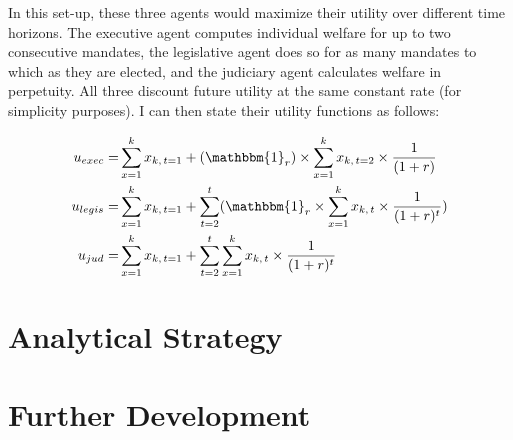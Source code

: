 \documentclass[11pt]{article}
\begin{document}
In this set-up, these three agents would maximize their utility over different time horizons. The executive agent computes individual welfare for up to two consecutive mandates, the legislative agent does so for as many mandates to which as they are elected, and the judiciary agent calculates welfare in perpetuity. All three discount future utility at the same constant rate (for simplicity purposes). I can then state their utility functions as follows:

\begin{equation} \label{eq:eq1}
  \begin{split}
    u_{exec} = & \sum_{x = 1}^{k} x_{k,\, t = 1} + (\mathbbm{1}_r) \times \sum_{x = 1}^{k} x_{k, \, t = 2} \times \frac{1}{(1 + r)} \\
    u_{legis}= & \sum_{x = 1}^{k} x_{k,\, t = 1} + \sum_{t = 2}^{t}(\mathbbm{1}_r \times \sum_{x = 1}^{k} x_{k, \, t} \times \frac{1}{(1 + r)^{t}}) \\
    u_{jud}  = & \sum_{x = 1}^{k} x_{k,\, t = 1} + \sum_{t = 2}^{t} \sum_{x = 1}^{k} x_{k, \, t} \times \frac{1}{(1 + r)^{t}} \\
  \end{split}
\end{equation}

\section{Analytical Strategy} \label{sec:methods_paper2}

\section{Further Development} \label{sec:conclusion_paper2}

\clearpage

\setlength\bibsep{0pt}


\end{document}
